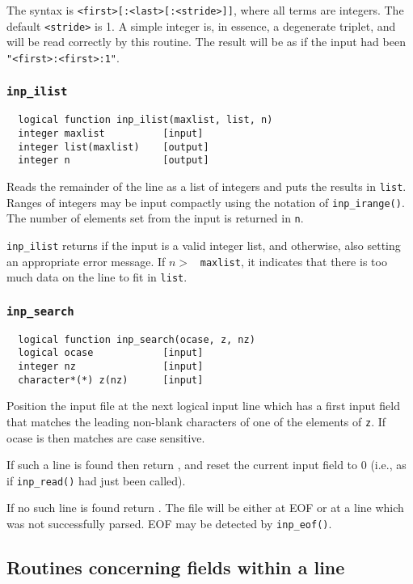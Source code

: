The syntax is \verb+<first>[:<last>[:<stride>]]+, where all terms are
integers.  The default \verb+<stride>+ is 1.  A simple integer is, in
essence, a degenerate triplet, and will be read correctly by this
routine.  The result will be as if the input had been
\verb+"<first>:<first>:1"+.

\subsubsection{{\tt inp\_ilist}}
\begin{verbatim}
  logical function inp_ilist(maxlist, list, n)
  integer maxlist          [input]
  integer list(maxlist)    [output]
  integer n                [output]
\end{verbatim}
Reads the remainder of the line as a list of integers and puts the
results in {\tt list}.  Ranges of integers may be input compactly
using the notation of \verb+inp_irange()+. The number of elements set
from the input is returned in \verb+n+.

\verb+inp_ilist+ returns \TRUE if the input is a valid integer
list, and \FALSE otherwise, also setting an appropriate error
message.  If $n > $ ~{\tt maxlist}, it indicates that there is too
much data on the line to fit in {\tt list}.

\subsubsection{{\tt inp\_search}}
\begin{verbatim}
  logical function inp_search(ocase, z, nz)
  logical ocase            [input]
  integer nz               [input]
  character*(*) z(nz)      [input]
\end{verbatim}
Position the input file at the next logical input line which has a
first input field that matches the leading non-blank characters of one
of the elements of \verb+z+.  If ocase is \TRUE then matches are case
sensitive.

If such a line is found then return \TRUE, and reset the
current input field to 0 (i.e., as if \verb+inp_read()+ had just been
called).

If no such line is found return \FALSE\@.  The file will be
either at EOF or at a line which was not successfully parsed.  EOF may
be detected by \verb+inp_eof()+.

\subsection{Routines concerning fields within a line}

